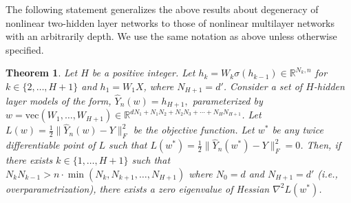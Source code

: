 \documentclass[10pt]{article}
\newtheorem{theorem}{Theorem}
\newcommand{\vect}{\mathrm{vec}}
\begin{document}
The following statement generalizes the above results about degeneracy of nonlinear two-hidden layer networks to those of nonlinear multilayer networks with an arbitrarily depth.
We use the same notation as above unless otherwise specified.
\begin{theorem} \label{thm:zero_eigenvalue}
Let $H$ be a positive integer. Let 
$
h_k =W_{k} \sigma(h_{k-1}) \in \mathbb R^{N_k,n}
$ 
for $k \in \{2,\dots,H+1\}$ and $h_1=W_{1}X$, where  $N_{H+1}=d'$.  Consider a set of $H$-hidden layer models of the form,
$
\hat Y_n(w) = h_{H+1}, 
$  
parameterized by $w=\vect(W_1,\dots,W_{H+1})\in \mathbb{R}^{dN_1+N_1N_2+N_2N_3+\cdots+N_HN_{H+1}}$. Let $L(w)=\frac{1}{2} \|\hat Y_n(w) -Y\|^2_F$ be the objective function. Let   $w^*$ be any twice differentiable point of $L$ such that $L(w^*)=\frac{1}{2} \|\hat Y_n(w^*) -Y\|^2_F=0$. Then, if there exists $k\in \{1,\dots,H+1\}$ such that $N_{k} N_{k-1} >n \cdot \min(N_{k},N_{k+1},\dots,N_{H+1})$ where $N_0 =d$ and  $N_{H+1}=d'$ (i.e., overparametrization), there exists a zero eigenvalue of Hessian $\nabla^2 L(w^{*})$.    
\end{theorem}
\end{document}
